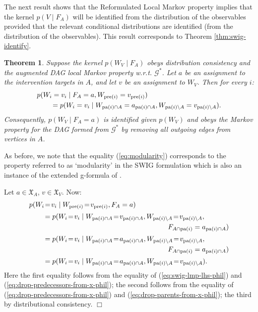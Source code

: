 \documentclass[11pt]{article}
\DeclareMathOperator{\pa}{pa}
\DeclareMathOperator{\pre}{pre}
\newtheorem{theorem}{Theorem}
\newcommand{\G}{{\mathscr G}}
\begin{document}
{The next result shows that the Reformulated Local Markov property implies that the kernel $p(V \mid F_A)$ will be identified from the distribution of the observables
provided that the relevant conditional distributions are identified (from the distribution of the observables).
This result corresponds to Theorem \ref{thm:swig-identify}.





\begin{theorem}\label{thm:augmented-identify}
Suppose the kernel $p(W_V \mid F_A)$ obeys distribution consistency and the augmented DAG local Markov property w.r.t. $\G^*$.
Let $a$ be an assignment to the intervention targets in $A$, and let $v$ be an assignment to $W_V$. Then for every $i$:
\begin{align}
\MoveEqLeft{p(W_i=v_i \mid F_{A}=a, W_{\pre(i)} = v_{\pre(i)})}\nonumber\\
&= p(W_i=v_i \mid W_{\pa(i)\cap A}=a_{\pa(i)\cap A}, W_{\pa(i) \setminus A} = v_{\pa(i) \setminus A}).\label{eq:modularity}
\end{align}
Consequently, $p(W_V \mid F_A = a)$ is identified given $p(W_V)$ and obeys the Markov property for the DAG formed from $\G^*$ by removing all outgoing edges from vertices in $A$.
\end{theorem}

As before, we note that the equality (\ref{eq:modularity}) corresponds to the property referred to as `modularity' in the SWIG formulation which is also an instance
of the extended g-formula of \citet{robins86new,robins:effects:2004}.
\medskip

Let $a \in \mathfrak{X}_A$, $v\in \mathfrak{X}_V$. Now:
\begin{align}
\MoveEqLeft{p(W_i\!=\! v_i \mid W_{\pre(i)}\!=\! v_{\pre(i)}, F_A=a)}\nonumber\\[2pt]
&=  p(W_i\!=\! v_i \mid W_{\pa(i)\cap A}\!=\! v_{\pa(i)\cap A}, W_{\pa(i)\setminus A}\!=\! v_{\pa(i)\setminus A},\nonumber\\
&\kern180pt F_{A\cap \pa(i)}=a_{\pa(i)\cap A} ) \nonumber\\[2pt]
&=  p(W_i\!=\! v_i \mid W_{\pa(i)\cap A}\!=\! a_{\pa(i)\cap A}, W_{\pa(i)\setminus A}\!=\! v_{\pa(i)\setminus A},\nonumber \\
&\kern180pt F_{A\cap \pa(i)}=a_{\pa(i)\cap A} ) \nonumber\\[2pt]
&=  p(W_i\!=\! v_i \mid W_{\pa(i)\cap A}\!=\! a_{\pa(i)\cap A}, W_{\pa(i)\setminus A}\!=\! v_{\pa(i)\setminus A} ).
\end{align}
Here the first equality follows from the equality of (\ref{eq:swig-lmp-lhs-phil}) and (\ref{eq:drop-predecessors-from-x-phil});  the second follows from
the equality of (\ref{eq:drop-predecessors-from-x-phil}) and (\ref{eq:drop-parents-from-x-phil}); the third by distributional consistency.
\hfill$\Box$



}
\end{document}
